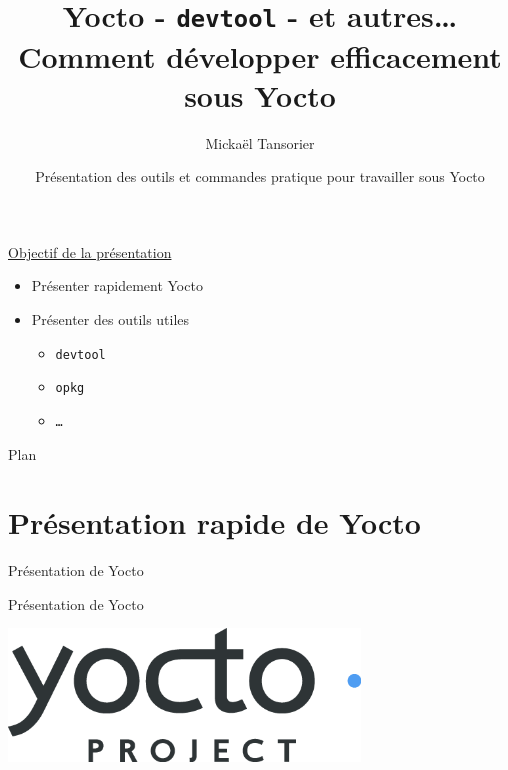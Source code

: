 \documentclass[compress]{beamer}
\title[Yocto]{Yocto - \texttt{devtool} - et autres… \\ \textbf{Comment développer efficacement sous Yocto}}
\author[Mickaël Tansorier]{Mickaël Tansorier}
\date[Mars 2018]{Présentation des outils et commandes pratique pour travailler sous Yocto}
\begin{document}


\begin{frame}
\titlepage
\end{frame}



\begin{frame}
\underline{Objectif de la présentation}
\begin{itemize}
	\item Présenter rapidement Yocto
	\item Présenter des outils utiles
	\begin{itemize}
		\item \texttt{devtool}
		\item \texttt{opkg}
		\item \texttt{…}
	\end{itemize}
\end{itemize}
\end{frame}


\begin{frame}{Plan}
\tableofcontents[hideallsubsections]
\end{frame}

\section{Présentation rapide de Yocto}

\begin{frame}{Présentation de Yocto}
\end{frame}

\begin{frame}{Présentation de Yocto}
\begin{center}
\includegraphics[width=0.7\textwidth]{logos/yocto-project-transp.png}
\end{center}
\end{frame}
\end{document}
